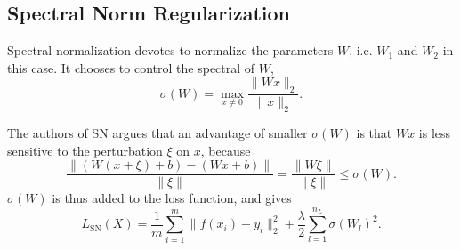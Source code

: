 \subsection{Spectral Norm Regularization}
Spectral normalization devotes to normalize the parameters $W$, i.e. $W_1$ and $W_2$ in this case. It chooses to control the spectral of $W$, 
\begin{equation}
\sigma(W)=\max_{x\neq0}\frac{\|Wx\|_2}{\|x\|_2}.
\end{equation}

The authors of SN argues that an advantage of smaller $\sigma(W)$ is that $Wx$ is less sensitive to the perturbation $\xi$ on $x$, because
\begin{equation}
\frac{\|(W(x+\xi)+b)-(Wx+b)\|}{\|\xi\|}=\frac{\|W\xi\|}{\|\xi\|}\leq\sigma(W).
\end{equation}
$\sigma(W)$ is thus added to the loss function, and gives
\begin{equation}
L_\text{SN}(X)=\frac{1}{m}\sum_{i=1}^m\|f(x_i)-y_i\|_2^2+\frac{\lambda}{2}\sum_{l=1}^{n_L}\sigma(W_l)^2.
\end{equation}
